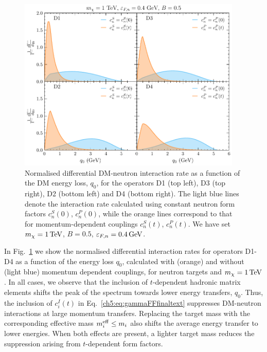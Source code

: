 \begin{figure}[t!bp] 
\centering
\includegraphics[width=0.95\textwidth]{capture_3/norm_diff_intrate_q_D1-D4.pdf} 
\caption[Normalised differential DM-neutron interaction rate as a function of the DM energy loss, $q_0$, for the operators D1 (top left), D3 (top right), D2 (bottom left) and D4 (bottom right).]{Normalised differential DM-neutron interaction rate as a function of the DM energy loss, $q_0$, for the operators D1 (top left), D3 (top right), D2 (bottom left) and D4 (bottom right). The light blue lines denote the interaction rate calculated using constant neutron form factors $c_n^S(0)$, $c_n^P(0)$, while the orange lines correspond to that for momentum-dependent couplings $c_n^S(t)$, $c_n^P(t)$. We have set $m_\chi=1{\rm \,TeV}$, $B=0.5$, $\varepsilon_{F,n}=0.4{\rm \,GeV}$.
}
\label{ch5:fig:intrateqtr1}
\end{figure}



In Fig.~\ref{ch5:fig:intrateqtr1} we show the normalised differential interaction rates for operators D1-D4 as a function of the energy loss $q_0$, calculated with (orange) and without (light blue) momentum dependent couplings, for neutron targets and $m_\chi=1{\rm \,TeV}$. In all cases, we observe that the inclusion of $t$-dependent hadronic matrix elements shifts the peak of the spectrum towards lower energy transfers, $q_0$. 
Thus, the inclusion of $c_i^I(t)$ in Eq.~\ref{ch5:eq:gammaFFfinaltext} suppresses DM-neutron interactions at large momentum transfers. 
Replacing the target mass with the corresponding effective mass $m_i^{\rm eff}\leq m_i$ also shifts the average energy transfer to lower energies.  When both effects are present, a lighter target mass reduces the suppression arising from $t$-dependent form factors. 

